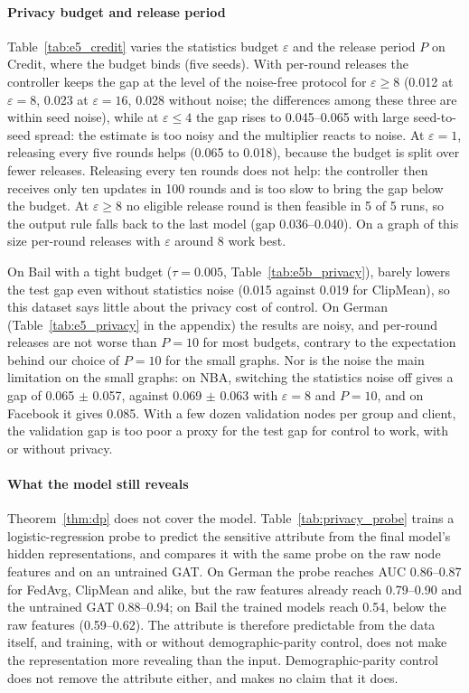 \paragraph{Privacy budget and release period}

Table~\ref{tab:e5_credit} varies the statistics budget $\varepsilon$ and the release period $P$ on Credit, where the budget binds (five seeds). With per-round releases the controller keeps the gap at the level of the noise-free protocol for $\varepsilon\ge8$ (0.012 at $\varepsilon=8$, 0.023 at $\varepsilon=16$, 0.028 without noise; the differences among these three are within seed noise), while at $\varepsilon\le4$ the gap rises to 0.045--0.065 with large seed-to-seed spread: the estimate is too noisy and the multiplier reacts to noise. At $\varepsilon=1$, releasing every five rounds helps (0.065 to 0.018), because the budget is split over fewer releases. Releasing every ten rounds does not help: the controller then receives only ten updates in 100 rounds and is too slow to bring the gap below the budget. At $\varepsilon\ge8$ no eligible release round is then feasible in 5 of 5 runs, so the output rule falls back to the last model (gap 0.036--0.040). On a graph of this size per-round releases with $\varepsilon$ around 8 work best.

On Bail with a tight budget ($\tau=0.005$, Table~\ref{tab:e5b_privacy}), \clamp{} barely lowers the test gap even without statistics noise (0.015 against 0.019 for ClipMean), so this dataset says little about the privacy cost of control. On German (Table~\ref{tab:e5_privacy} in the appendix) the results are noisy, and per-round releases are not worse than $P=10$ for most budgets, contrary to the expectation behind our choice of $P=10$ for the small graphs. Nor is the noise the main limitation on the small graphs: on NBA, switching the statistics noise off gives a gap of 0.065 $\pm$ 0.057, against 0.069 $\pm$ 0.063 with $\varepsilon=8$ and $P=10$, and on Facebook it gives 0.085. With a few dozen validation nodes per group and client, the validation gap is too poor a proxy for the test gap for control to work, with or without privacy.

\paragraph{What the model still reveals}

Theorem~\ref{thm:dp} does not cover the model. Table~\ref{tab:privacy_probe} trains a logistic-regression probe to predict the sensitive attribute from the final model's hidden representations, and compares it with the same probe on the raw node features and on an untrained GAT. On German the probe reaches AUC 0.86--0.87 for FedAvg, ClipMean and \clamp{} alike, but the raw features already reach 0.79--0.90 and the untrained GAT 0.88--0.94; on Bail the trained models reach 0.54, below the raw features (0.59--0.62). The attribute is therefore predictable from the data itself, and training, with or without demographic-parity control, does not make the representation more revealing than the input. Demographic-parity control does not remove the attribute either, and \clamp{} makes no claim that it does.

